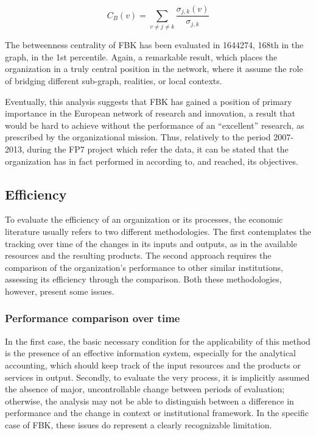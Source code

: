 \[
	C_B (v) =
		\sum_{v \neq j \neq k}
			\frac {\sigma_{j,k} (v)}{\sigma_{j,k}}
\]

The betweenness centrality of FBK has been evaluated in 1644274, 168th in the graph, in the 1st percentile. Again, a remarkable result, which places the organization in a truly central position in the network, where it assume the role of bridging different sub-graph, realities, or local contexts. 

Eventually, this analysis suggests that FBK has gained a position of primary importance in the European network of research and innovation, a result that would be hard to achieve without the performance of an \enquote{excellent} research, as prescribed by the organizational mission. Thus, relatively to the period 2007-2013, during the FP7 project which refer the data, it can be stated that the organization has in fact performed in according to, and reached, its objectives. 

\subsection{Efficiency}

To evaluate the efficiency of an organization or its processes, the economic literature usually refers to two different methodologies. The first contemplates the tracking over time of the changes in its inputs and outputs, as in the available resources and the resulting products. The second approach requires the comparison of the organization's performance to other similar institutions, assessing its efficiency through the comparison. Both these methodologies, however, present some issues.

\subsubsection{Performance comparison over time}

In the first case, the basic necessary condition for the applicability of this method is the presence of an effective information system, especially for the analytical accounting, which should keep track of the input resources and the products or services in output. Secondly, to evaluate the very process, it is implicitly assumed the absence of major, uncontrollable change between periods of evaluation; otherwise, the analysis may not be able to distinguish between a difference in performance and the change in context or institutional framework. In the specific case of FBK, these issues do represent a clearly recognizable limitation. 

